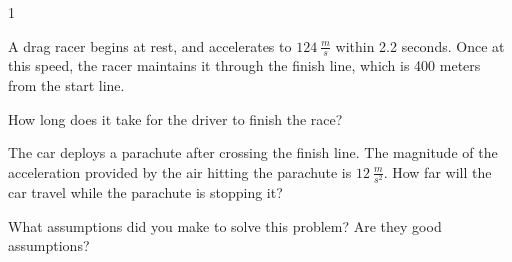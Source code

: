 
\AddToShipoutPicture*{\BackgroundPic}

\addtocounter {ProbNum} {1}

 
{\bf \Large{}} A drag racer begins at rest, and accelerates to ${124~\tfrac{m}{s}}$ within 2.2 seconds.  Once at this speed, the racer maintains it through the finish line, which is 400 meters from the start line. \bigskip

How long does it take for the driver to finish the race?
\vfill

The car deploys a parachute after crossing the finish line.  The magnitude of the acceleration provided by the air hitting the parachute is ${12~\tfrac{m}{s^2}}$.  How far will the car travel while the parachute is stopping it? 

\vfill

What assumptions did you make to solve this problem?  Are they good assumptions?
\vspace{30mm}


\newpage